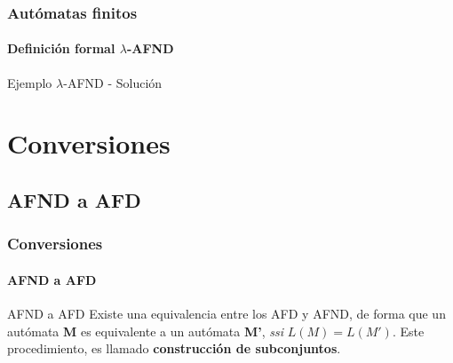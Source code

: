 \documentclass{beamer}
\begin{document}
        \begin{frame}
			\frametitle{Aut\'omatas finitos}
			\framesubtitle{Definici\'on formal $\lambda$-AFND}

            \begin{exampleblock}{Ejemplo $\lambda$-AFND - Soluci\'on}
               \begin{center}
			   \end{center}
            \end{exampleblock}
		\end{frame}

    \section{Conversiones}

        \subsection{AFND a AFD}
       
        \begin{frame}
			\frametitle{Conversiones}
			\framesubtitle{AFND a AFD}

            \begin{block}{AFND a AFD}
               Existe una equivalencia entre los AFD y AFND, de forma que un aut\'omata \textbf{M} es equivalente a un aut\'omata \textbf{M'}, \emph{ssi} $L(M) = L(M')$. Este procedimiento, es llamado \textbf{construcci\'on de subconjuntos}.
            \end{block}
		\end{frame}
\end{document}
